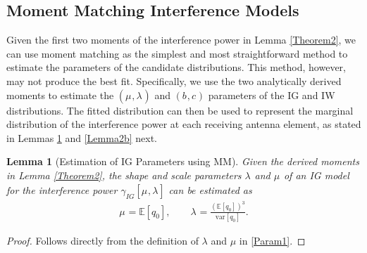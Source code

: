 \documentclass[12pt, draftclsnofoot, onecolumn]{IEEEtran}
\newtheorem{MomentsLemma}{Lemma}
\theoremstyle{plain}
\begin{document}
\subsection{Moment Matching Interference Models} \label{MMmodel}%
Given the first two moments of the interference power in Lemma \ref{Theorem2}, we can use moment matching as the simplest and most straightforward method to estimate the parameters of the candidate distributions. This method, however, may not produce the best fit. Specifically, we use the two analytically derived moments to estimate the $({{\mu_{}}}, {{\lambda_{}}})$ and $({{b_{}}}, {{c_{}}})$ parameters of the IG and IW distributions. %
The fitted distribution can then be used to represent the marginal distribution of the interference power at each receiving antenna element, as stated in Lemmas \ref{Lemma2a} and \ref{Lemma2b} next.
\begin{MomentsLemma}[Estimation of IG Parameters using MM] \label{Lemma2a}
Given the derived moments in Lemma \ref{Theorem2}, the shape and scale parameters ${{\lambda_{}}}$ and ${{\mu_{}}}$ of an IG model for the interference power $\gamma_{IG}[{{\mu_{}}},{{\lambda_{}}}]$ can be estimated as \vspace{-.1in}
\begin{eqnarray}\label{proofeq}
{{\mu_{}}}={ \mathbb{E}[\mathit{q}_{0}]},\quad \quad
{{\lambda_{}}}=\frac{\left( \mathbb{E}[\mathit{q}_{0}] \right)^3}{\text{var}[\mathit{q}_{0}]}.
\end{eqnarray}
\end{MomentsLemma}
%
\begin{proof}
Follows directly from the definition of $\lambda$ and $\mu$  in \eqref{Param1}.
\end{proof}
\end{document}
